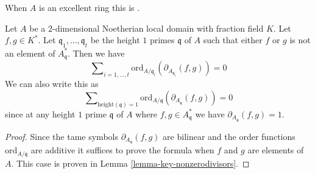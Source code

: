 \begin{lemma}
\label{lemma-milnor-gersten-low-degree}
\begin{reference}
When $A$ is an excellent ring this is \cite[Proposition 1]{Kato-Milnor-K}.
\end{reference}
Let $A$ be a $2$-dimensional Noetherian local domain with fraction field $K$.
Let $f, g \in K^*$.
Let $\mathfrak q_1, \ldots, \mathfrak q_t$ be the height
$1$ primes $\mathfrak q$ of $A$ such that either $f$ or $g$ is not an
element of $A^*_{\mathfrak q}$.
Then we have
$$
\sum\nolimits_{i = 1, \ldots, t}
\text{ord}_{A/\mathfrak q_i}(\partial_{A_{\mathfrak q_i}}(f, g))
=
0
$$
We can also write this as
$$
\sum\nolimits_{\text{height}(\mathfrak q) = 1}
\text{ord}_{A/\mathfrak q}(\partial_{A_{\mathfrak q}}(f, g))
=
0
$$
since at any height $1$ prime $\mathfrak q$
of $A$ where $f, g \in A^*_{\mathfrak q}$
we have $\partial_{A_{\mathfrak q}}(f, g) = 1$.
\end{lemma}

\begin{proof}
Since the tame symbols $\partial_{A_{\mathfrak q}}(f, g)$ are
bilinear and the order functions $\text{ord}_{A/\mathfrak q}$
are additive it suffices to prove the formula when
$f$ and $g$ are elements of $A$. This case is proven in
Lemma \ref{lemma-key-nonzerodivisors}.
\end{proof}

